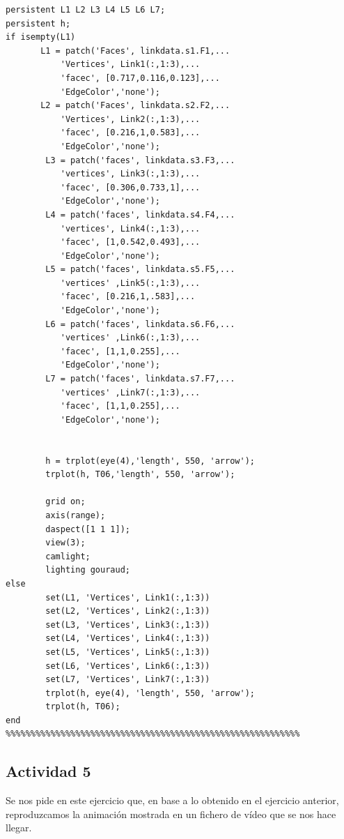 \documentclass{article}
\begin{document}
\begin{lstlisting}[frame=single]
persistent L1 L2 L3 L4 L5 L6 L7;
persistent h;
if isempty(L1) 
       L1 = patch('Faces', linkdata.s1.F1,...
           'Vertices', Link1(:,1:3),...
           'facec', [0.717,0.116,0.123],...
           'EdgeColor','none');   
       L2 = patch('Faces', linkdata.s2.F2,...
           'Vertices', Link2(:,1:3),...
           'facec', [0.216,1,0.583],...
           'EdgeColor','none');
        L3 = patch('faces', linkdata.s3.F3,...
           'vertices', Link3(:,1:3),...
           'facec', [0.306,0.733,1],...
           'EdgeColor','none');
        L4 = patch('faces', linkdata.s4.F4,...
           'vertices', Link4(:,1:3),...
           'facec', [1,0.542,0.493],...
           'EdgeColor','none');
        L5 = patch('faces', linkdata.s5.F5,...
           'vertices' ,Link5(:,1:3),...
           'facec', [0.216,1,.583],...
           'EdgeColor','none');
        L6 = patch('faces', linkdata.s6.F6,...
           'vertices' ,Link6(:,1:3),...
           'facec', [1,1,0.255],...
           'EdgeColor','none');
        L7 = patch('faces', linkdata.s7.F7,...
           'vertices' ,Link7(:,1:3),...
           'facec', [1,1,0.255],...
           'EdgeColor','none');
       

        h = trplot(eye(4),'length', 550, 'arrow');
        trplot(h, T06,'length', 550, 'arrow');

        grid on;
        axis(range);
        daspect([1 1 1]);
        view(3); 
        camlight;
        lighting gouraud;
else
        set(L1, 'Vertices', Link1(:,1:3))
        set(L2, 'Vertices', Link2(:,1:3))
        set(L3, 'Vertices', Link3(:,1:3))
        set(L4, 'Vertices', Link4(:,1:3))
        set(L5, 'Vertices', Link5(:,1:3))
        set(L6, 'Vertices', Link6(:,1:3))
        set(L7, 'Vertices', Link7(:,1:3))
        trplot(h, eye(4), 'length', 550, 'arrow');
        trplot(h, T06);
end 
%%%%%%%%%%%%%%%%%%%%%%%%%%%%%%%%%%%%%%%%%%%%%%%%%%%%%%%%%%%
\end{lstlisting}

\subsection{Actividad 5}
Se nos pide en este ejercicio que, en base a lo obtenido en el ejercicio anterior, reproduzcamos la animación mostrada en un fichero de vídeo que se nos hace llegar.
\end{document}
